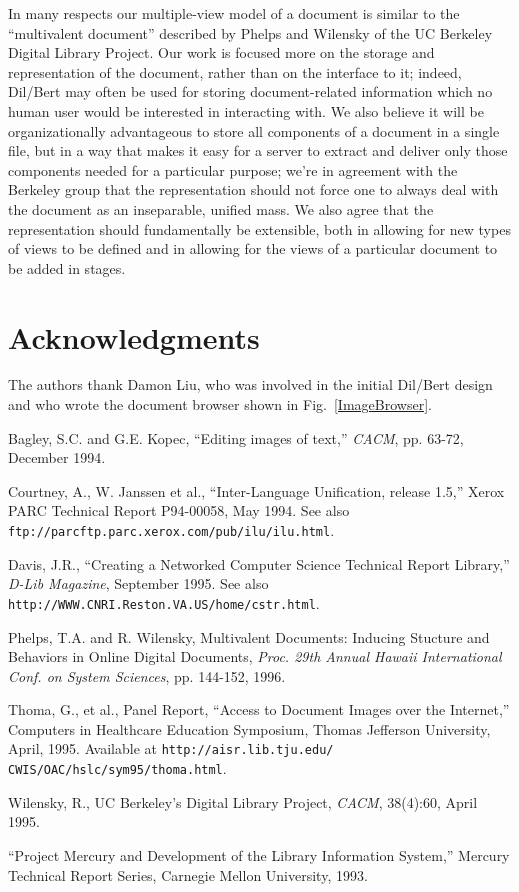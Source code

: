 In many respects our multiple-view model of a document is similar to the
``multivalent document'' described by Phelps and Wilensky\cite{berk2} of the
UC Berkeley Digital Library Project.  Our work is focused more on the
storage and representation of the document, rather than on the interface
to it; indeed, Dil/Bert may often be used for storing document-related
information which no human user would be interested in interacting with.
We also believe it will be organizationally advantageous to store all
components of a document in a single file, but in a way that makes it
easy for a server to extract and deliver only those components needed
for a particular purpose; we're in agreement with the Berkeley group
that the representation should not force one to always deal with the
document as an inseparable, unified mass.  We also agree that the
representation should fundamentally be extensible, both in allowing for
new types of views to be defined and in allowing for the views of a
particular document to be added in stages.

\section{Acknowledgments}

The authors thank Damon Liu, who was involved in the initial Dil/Bert
design and who wrote the document browser shown in Fig.\
\ref{ImageBrowser}.

\begin{thebibliography}{99}

Bagley, S.C. and G.E. Kopec, ``Editing images of text,''
{\it CACM\/}, pp. 63-72, December 1994. 

Courtney, A., W. Janssen et al., ``Inter-Language Unification, release 1.5,'' Xerox PARC Technical Report P94-00058, May 1994. See also {\tt ftp://parcftp.parc.xerox.com/pub/ilu/ilu.html}.

Davis, J.R., ``Creating a Networked Computer Science
Technical Report Library,'' {\it D-Lib Magazine\/}, September 1995.  See
also {\tt http://WWW.CNRI.Reston.VA.US/home/cstr.html}.

Phelps, T.A. and R. Wilensky, Multivalent Documents: Inducing
Stucture and Behaviors in Online Digital Documents, {\it Proc. 29th
Annual Hawaii International Conf. on System Sciences\/}, pp. 144-152,
1996. 

Thoma, G., et al., Panel Report, ``Access to Document Images over the Internet,'' Computers in Healthcare Education Symposium, Thomas Jefferson University, April, 1995. Available at {\tt http://aisr.lib.tju.edu/ CWIS/OAC/hslc/sym95/thoma.html}.

Wilensky, R., UC Berkeley's Digital Library Project,
{\it CACM\/}, 38(4):60, April 1995.

``Project Mercury and Development of the Library Information System,'' Mercury Technical Report Series, Carnegie Mellon University, 1993.

\end{thebibliography}
\vskip2in

